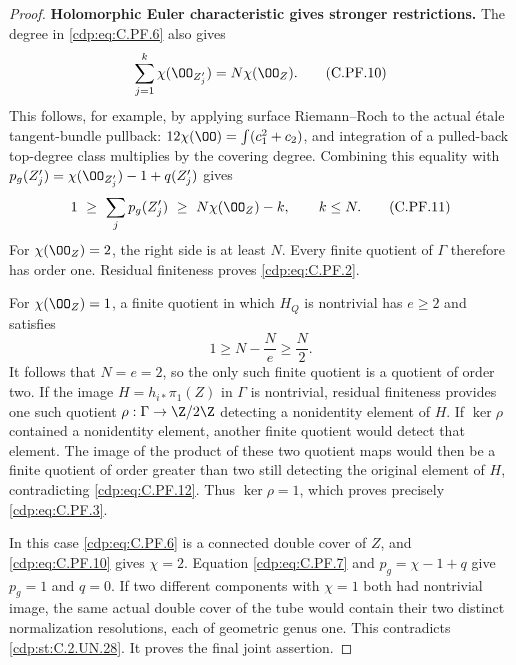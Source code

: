 \begin{proof}
\par\medskip\noindent\textbf{Holomorphic Euler characteristic gives stronger restrictions.}
The degree in \eqref{cdp:eq:C.PF.6} also gives
\[
       \sum_{j=1}^k\chi(\OO_{Z_j'})=N\chi(\OO_Z).
                                                        \tag{C.PF.10}\label{cdp:eq:C.PF.10}
\]
This follows, for example, by applying surface Riemann--Roch to
the actual \'{e}tale tangent-bundle pullback:
$12\chi(\OO)=\int(c_1^2+c_2)$, and integration of a pulled-back
top-degree class multiplies by the covering degree. Combining
this equality with
$p_g(Z_j')=\chi(\OO_{Z_j'})-1+q(Z_j')$ gives
\[
       1\ \ge\ \sum_j p_g(Z_j')
           \ \ge\ N\chi(\OO_Z)-k,\qquad k\le N .
                                                        \tag{C.PF.11}\label{cdp:eq:C.PF.11}
\]
For $\chi(\OO_Z)=2$, the right side is at least $N$.
Every finite quotient of $\Gamma$ therefore has order one.
Residual finiteness proves \eqref{cdp:eq:C.PF.2}.

For $\chi(\OO_Z)=1$, a finite quotient in which $H_Q$ is
nontrivial has $e\ge2$ and satisfies
\[
                    1\ge N-\frac Ne\ge\frac N2 .
                                                        \tag{C.PF.12}\label{cdp:eq:C.PF.12}
\]
It follows that $N=e=2$, so the only such finite quotient
is a quotient of order two. If the image
$H=h_{i*}\pi_1(Z)$ in $\Gamma$ is nontrivial, residual
finiteness provides one such quotient
$\rho:\Gamma\to\Z/2\Z$ detecting a nonidentity element of $H$.
If $\ker\rho$ contained a nonidentity element, another finite
quotient would detect that element. The image of the product
of these two quotient maps would then be a finite quotient
of order greater than two still detecting the original
element of $H$, contradicting \eqref{cdp:eq:C.PF.12}. Thus $\ker\rho=1$,
which proves precisely \eqref{cdp:eq:C.PF.3}.

In this case \eqref{cdp:eq:C.PF.6} is a connected double cover of $Z$,
and \eqref{cdp:eq:C.PF.10} gives $\chi=2$. Equation \eqref{cdp:eq:C.PF.7} and
$p_g=\chi-1+q$ give $p_g=1$ and $q=0$. If two different
components with $\chi=1$ both had nontrivial image, the
same actual double cover of the tube would contain their
two distinct normalization resolutions, each of geometric
genus one. This contradicts \ref{cdp:st:C.2.UN.28}. It proves the final
joint assertion.
\end{proof}


